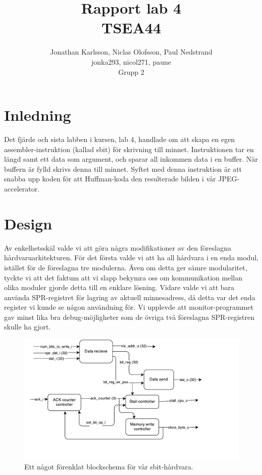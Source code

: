 \documentclass[a4paper]{article}
\author{Jonathan Karlsson, Niclas Olofsson, Paul Nedstrand\\jonka293, nicol271, paune\\Grupp 2}
\title{Rapport lab 4\\ \vspace{2 mm} {\large TSEA44}}
\begin{document}
\maketitle
\newpage

\tableofcontents
\newpage

\section{Inledning}

Det fjärde och sista labben i kursen, lab 4, handlade om att skapa
en egen assembler-instruktion (kallad sbit) för skrivning till minnet.
Instruktionen tar en längd samt ett data som argument, och sparar all
inkommen data i en buffer. När buffern är fylld skrivs denna till
minnet. Syftet med denna instruktion är att snabba upp koden för att
Huffman-koda den resulterade bilden i vår JPEG-accelerator.\\

\section{Design}

Av enkelhetsskäl valde vi att göra några modifikationer av den
föreslagna hårdvaruarkitekturen. För det första valde vi att ha all
hårdvara i en enda modul, istället för de föreslagna tre modulerna. Även
om detta ger sämre modularitet, tyckte vi att det faktum att vi slapp
bekymra oss om kommunikation mellan olika moduler gjorde detta till en
enklare lösning. Vidare valde vi att bara använda SPR-registret för
lagring av aktuell minnesadress, då detta var det enda register vi kunde
se någon användning för. Vi upplevde att monitor-programmet gav minst
lika bra debug-möjligheter som de övriga två föreslagna SPR-registren
skulle ha gjort.\\

\begin{figure}[H]
\centering
\includegraphics[width=1.0\textwidth]{blockschema.pdf}
\caption{Ett något förenklat blockschema för vår sbit-hårdvara.}
\label{fig:blockschema}
\end{figure}
\end{document}
